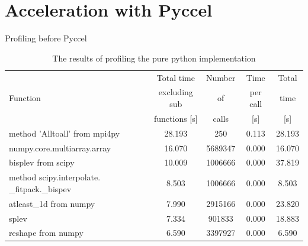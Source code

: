 \documentclass{beamer}
\begin{document}
\section{Acceleration with Pyccel}

\begin{frame}{Profiling before Pyccel}
\footnotesize
 \begin{table}[ht]
 \begin{tabular}{|m{}|c|c|c|c|}
  \hline
          & Total time & Number & Time & Total \\
  Function & excluding sub & of & per call & time \\
          & functions [s] & calls & [s] & [s] \\
  \hline
  \hline
  method 'Alltoall' from mpi4py & 28.193 & 250 & 0.113 & 28.193 \\
  \hline
  numpy.core.multiarray.array & 16.070 & 5689347 & 0.000 & 16.070 \\
  \hline
  bisplev from scipy & 10.009 & 1006666 & 0.000 & 37.819\\
  \hline
  method scipy.interpolate. \_fitpack.\_bispev & 8.503 & 1006666 & 0.000 & 8.503\\
  \hline
  atleast\_1d from numpy & 7.990 & 2915166 & 0.000 & 23.820\\
  \hline
  splev & 7.334 & 901833 & 0.000 & 18.883\\
  \hline
  reshape from numpy & 6.590 & 3397927 & 0.000 & 6.590\\
  \hline
 \end{tabular}
\caption{\label{tab::pure python profile} The results of profiling the pure python implementation}
\end{table}
\end{frame}
\end{document}
